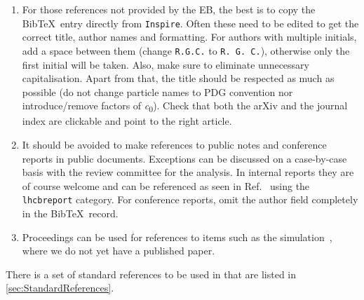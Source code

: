 \begin{enumerate}
\item For those references not provided by the EB, the best
  is to copy the Bib\TeX\ entry directly from
  \texttt{Inspire}. Often these need to be edited to get the 
  correct title, author names and formatting. 
  For authors with multiple initials, add a space between them (change \texttt{R.G.C.} to \texttt{R. G. C.}),
  otherwise only the first initial will be taken. 
  Also, make sure to eliminate unnecessary capitalisation.
  Apart from that, the title should be respected as much as possible
  (\eg do not change particle names to PDG convention nor introduce/remove 
  factors of \si{\clight}).
  Check that both the arXiv and the journal index are clickable
  and point to the right article.


\item It should be avoided to make references to public notes and
  conference reports in public documents. Exceptions can be discussed
  on a case-by-case basis with the review committee for the
  analysis. In internal reports they are of course welcome and can be
  referenced as seen in Ref.~\cite{LHCb-CONF-2011-003} using the
  \texttt{lhcbreport} category. For conference reports, omit the
  author field completely in the Bib\TeX\ record.

\item Proceedings can be used for references to items such as the
  \lhcb simulation~\cite{LHCb-PROC-2011-006}, where we do not yet have
  a published paper.

\end{enumerate}

There is a set of standard references to be used in \lhcb that are
listed in \cref{sec:StandardReferences}.
